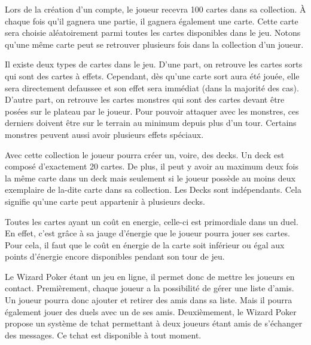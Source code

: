 \documentclass[11pt,a4paper]{article}
\begin{document}
\medbreak

Lors de la création d'un compte, le joueur recevra 100 cartes dans sa \gls{collection}.  À chaque fois qu'il gagnera une partie, il gagnera également une carte.  Cette carte sera choisie aléatoirement parmi toutes les cartes disponibles dans le jeu.  Notons qu'une même carte peut se retrouver plusieurs fois dans la \gls{collection} d'un joueur.

\medbreak
{}
Il existe deux types de \gls{carte}s dans le jeu. D'une part, on retrouve les cartes \gls{sort}s qui sont des cartes à effets. Cependant, dès qu'une carte \gls{sort} aura été jouée, elle sera directement \gls{defausse}e et son effet sera immédiat (dans la majorité des cas). D'autre part, on retrouve les cartes \gls{monstre}s qui sont des cartes devant être posées sur le plateau par le joueur. Pour pouvoir attaquer avec les monstres, ces derniers doivent être sur le terrain au minimum depuis plus d'un tour. Certains monstres peuvent aussi avoir plusieurs effets spéciaux.

\medbreak

Avec cette \gls{collection} le joueur pourra créer un, voire, des \gls{deck}s.  Un \gls{deck} est composé d'exactement 20 cartes.  De plus, il peut y avoir au maximum deux fois la même carte dans un \gls{deck} mais seulement si le joueur possède au moins deux exemplaire de la-dite carte dans sa \gls{collection}.  Les Decks sont indépendants.  Cela signifie qu'une carte peut appartenir à plusieurs decks.

\medbreak

Toutes les cartes ayant un coût en \gls{energie}, celle-ci est primordiale dans un duel. En effet, c'est grâce à sa jauge d'énergie que le joueur pourra jouer ses cartes. Pour cela, il faut que le coût en énergie de la carte soit inférieur ou égal aux points d'énergie encore disponibles pendant son tour de jeu.

\medbreak

Le Wizard Poker étant un jeu en ligne, il permet donc de mettre les joueurs en contact. Premièrement, chaque joueur a la possibilité de gérer une liste d'amis. Un joueur pourra donc ajouter et retirer des amis dans sa liste. Mais il pourra également jouer des duels avec un de ses amis. Deuxièmement, le Wizard Poker propose un système de \gls{tchat} permettant à deux joueurs étant amis de s'échanger des messages.  Ce tchat est disponible à tout moment.
\end{document}
